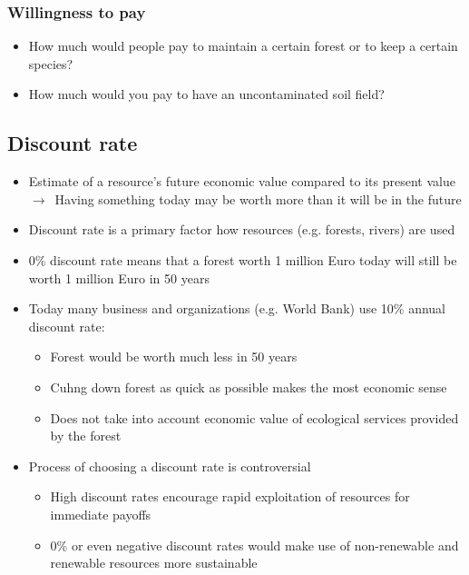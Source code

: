 \documentclass{article}
\begin{document}
\subsubsection{Willingness to pay}
\begin{itemize}
    \item How much would people pay to maintain a certain forest or to keep a certain species?
    \item How much would you pay to have an uncontaminated soil field?
\end{itemize}

\subsection{Discount rate}
\begin{itemize}
    \item Estimate of a resource’s future economic value compared to its present value\\
        $\to$\ Having something today may be worth more than it will be in the future
    \item Discount rate is a primary factor how resources (e.g. forests, rivers) are used
    \item 0\% discount rate means that a forest worth 1 million Euro today will still be worth 1 million Euro in 50 years
    \item Today many business and organizations (e.g. World Bank) use 10\% annual discount rate:
        \begin{itemize}[label=$\to$]
            \item Forest would be worth much less in 50 years
            \item Cuhng down forest as quick as possible makes the most economic sense
            \item Does not take into account economic value of ecological services provided by the forest
        \end{itemize}
    \item Process of choosing a discount rate is controversial
        \begin{itemize}[label=$\to$]
            \item High discount rates encourage rapid exploitation of resources for immediate payoffs
            \item 0\% or even negative discount rates would make use of non-renewable and renewable resources more sustainable
        \end{itemize}
\end{itemize}
\end{document}
